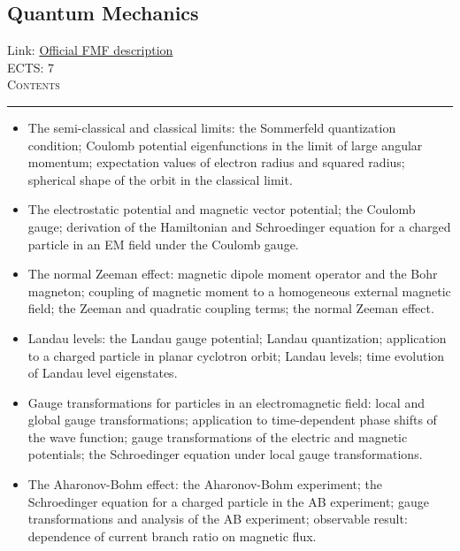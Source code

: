 \documentclass[11pt, a4paper]{article}
\newenvironment{course}[3]{
\subsection{#1}%
Link: \href{#2}{Official FMF description}\\%
ECTS: #3%
\vspace{1ex}
\\
{\large \textsc{Contents}}\\[-0.9ex]%
\rule{\textwidth}{0.5pt}
\vspace{-3ex}
}
{}
\newenvironment{chapter}[1]{
\begin{tcolorbox}[title=#1, breakable]
}
{\end{tcolorbox}}
\begin{document}
\begin{course}{Quantum Mechanics}{https://www.fmf.uni-lj.si/en/study-physics/programmes/1fiz/2020/7000777/courses/1156/}{7}
\begin{chapter}{The central potential}
\begin{itemize}
            \item The semi-classical and classical limits: the Sommerfeld quantization condition; Coulomb potential eigenfunctions in the limit of large angular momentum; expectation values of  electron radius and squared radius; spherical shape of the orbit in the classical limit.
            
            
        \end{itemize}
    \end{chapter}

    \begin{chapter}{The charged particle in an electromagnetic field}

        \begin{itemize}
        
            \item The electrostatic potential and magnetic vector potential; the Coulomb gauge; derivation of the Hamiltonian and Schroedinger equation for a charged particle in an EM field under the Coulomb gauge.

            \item The normal Zeeman effect: magnetic dipole moment operator and the Bohr magneton; coupling of magnetic moment to a homogeneous external magnetic field; the Zeeman and quadratic coupling terms; the normal Zeeman effect.

            \item Landau levels: the Landau gauge potential; Landau quantization; application to a charged particle in planar cyclotron orbit; Landau levels; time evolution of Landau level eigenstates.

            \item Gauge transformations for particles in an electromagnetic field: local and global gauge transformations; application to time-dependent phase shifts of the wave function; gauge transformations of the electric and magnetic potentials; the Schroedinger equation under local gauge transformations.

            \item The Aharonov-Bohm effect: the Aharonov-Bohm experiment; the Schroedinger equation for a charged particle in the AB experiment; gauge transformations and analysis of the AB experiment; observable result: dependence of current branch ratio on magnetic flux.
        
        \end{itemize}
    \end{chapter}


\end{course}
\end{document}
